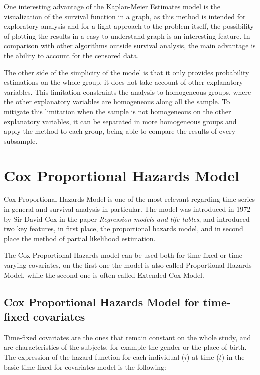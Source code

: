\documentclass[11pt]{book} %
\begin{document}
    One interesting advantage of the Kaplan-Meier Estimates model is the visualization of the survival function in a graph, as this method is intended for exploratory analysis and for a light approach to the problem itself, the possibility of plotting the results in a easy to understand graph is an interesting feature. In comparison with other algorithms outside survival analysis, the main advantage is the ability to account for the censored data.

    The other side of the simplicity of the model is that it only provides probability estimations on the whole group, it does not take account of other explanatory variables. This limitation constraints the analysis to homogeneous groups, where the other explanatory variables are homogeneous along all the sample. To mitigate this limitation when the sample is not homogeneous on the other explanatory variables, it can be separated in more homogeneous groups and apply the method to each group, being able to compare the results of every subsample.

  \section{Cox Proportional Hazards Model}

    Cox Proportional Hazards Model is one of the most relevant regarding time series in general and survival analysis in particular. The model was introduced in 1972 by Sir David Cox in the paper \emph{Regression models and life tables}, and introduced two key features, in first place, the proportional hazards model, and in second place the method of partial likelihood estimation.

    The Cox Proportional Hazards model can be used both for time-fixed or time-varying covariates, on the first one the model is also called Proportional Hazards Model, while the second one is often called Extended Cox Model.

    \subsection{Cox Proportional Hazards Model for time-fixed covariates}

      Time-fixed covariates are the ones that remain constant on the whole study, and are characteristics of the subjects, for example the gender or the place of birth. The expression of the hazard function for each individual ($i$) at time ($t$) in the basic time-fixed for covariates model is the following:
\end{document}
